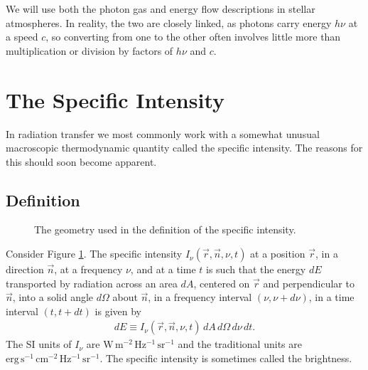 \newslide

We will use both the photon gas and energy flow descriptions in stellar
atmospheres. In reality, the two are closely linked, as photons carry
energy $h\nu$ at a speed $c$, so converting from one to the other often
involves little more than multiplication or division by factors of
$h\nu$ and $c$.

\newslide

\section{The Specific Intensity}

In radiation transfer we most commonly work with a somewhat unusual
macroscopic thermodynamic quantity called the specific intensity. The
reasons for this should soon become apparent.

\newslide

\subsection{Definition}

\begin{figure}
\begin{center}
\end{center}
\caption{The geometry used in the definition of the
specific intensity.}
\label{fig-specific-intensity-definition}
\end{figure}

Consider Figure \ref{fig-specific-intensity-definition}.
The specific intensity $I_\nu(\vec r, \vec n, \nu, t)$ at a
position $\vec r$, in a direction $\vec n$, at a frequency
$\nu$, and at a time $t$ is such that the energy $dE$
transported by radiation across an area $dA$, centered on
$\vec r$ and perpendicular to $\vec n$, into a solid angle
$d\Omega$ about $\vec n$, in a frequency interval $(\nu,
\nu+d\nu)$, in a time interval $(t,t+dt)$ is given by
\begin{align}
dE \equiv I_\nu(\vec r, \vec n, \nu, t)\,dA\,d\Omega\,d\nu\,dt.
\end{align}
The SI units of $I_\nu$ are
$\mathrm{W\,m^{-2}\,Hz^{-1}\,sr^{-1}}$ and the traditional units are $\mathrm{erg\,s^{-1}\,cm^{-2}\,Hz^{-1}\,sr^{-1}}$. The
specific intensity is sometimes called the brightness.

